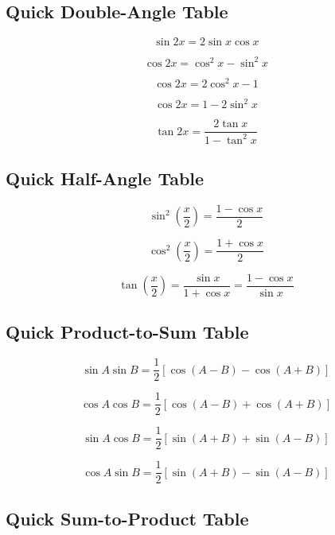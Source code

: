 \subsection{Quick Double-Angle Table}
\label{subsec:quick-double-angle-trig}

\[
\boxed{
\sin2x
=
2\sin x\cos x
}
\]

\[
\boxed{
\cos2x
=
\cos^2x-\sin^2x
}
\]

\[
\boxed{
\cos2x
=
2\cos^2x-1
}
\]

\[
\boxed{
\cos2x
=
1-2\sin^2x
}
\]

\[
\boxed{
\tan2x
=
\frac{
2\tan x
}{
1-\tan^2x
}
}
\]

\subsection{Quick Half-Angle Table}
\label{subsec:quick-half-angle-trig}

\[
\boxed{
\sin^2\left(\frac{x}{2}\right)
=
\frac{1-\cos x}{2}
}
\]

\[
\boxed{
\cos^2\left(\frac{x}{2}\right)
=
\frac{1+\cos x}{2}
}
\]

\[
\boxed{
\tan\left(\frac{x}{2}\right)
=
\frac{\sin x}{1+\cos x}
=
\frac{1-\cos x}{\sin x}
}
\]

\subsection{Quick Product-to-Sum Table}
\label{subsec:quick-product-to-sum-trig}

\[
\boxed{
\sin A\sin B
=
\frac12
[
\cos(A-B)-\cos(A+B)
]
}
\]

\[
\boxed{
\cos A\cos B
=
\frac12
[
\cos(A-B)+\cos(A+B)
]
}
\]

\[
\boxed{
\sin A\cos B
=
\frac12
[
\sin(A+B)+\sin(A-B)
]
}
\]

\[
\boxed{
\cos A\sin B
=
\frac12
[
\sin(A+B)-\sin(A-B)
]
}
\]

\subsection{Quick Sum-to-Product Table}
\label{subsec:quick-sum-to-product-trig}

